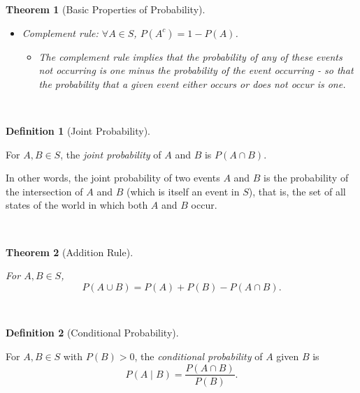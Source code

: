 \documentclass[
]{article}
\providecommand{\tightlist}{%
  \setlength{\itemsep}{0pt}\setlength{\parskip}{0pt}}
\newtheorem{theorem}{Theorem}[section]
\theoremstyle{definition}
\newtheorem{definition}{Definition}[section]
\theoremstyle{definition}
\theoremstyle{definition}
\theoremstyle{remark}
\begin{document}
\begin{theorem}[Basic Properties of Probability]
\begin{itemize}
  \begin{itemize}
  \tightlist
  \item
    Monotonicity and unitarity (and non-negativity) imply the probability bounds since \(A \subseteq \Omega\).
  \end{itemize}
\item
  \emph{Complement rule}: \(\forall A \in S\), \(P(A^c) = 1 - P(A)\).

  \begin{itemize}
  \tightlist
  \item
    The complement rule implies that the probability of any of these events not occurring is one minus the probability of the event occurring - so that the probability that a given event either occurs or does not occur is one.
  \end{itemize}
\end{itemize}

~

\end{theorem}

\begin{definition}[Joint Probability]
\protect\hypertarget{def:unlabeled-div-5}{}\label{def:unlabeled-div-5}

For \(A, B \in S\), the \emph{joint probability} of \(A\) and \(B\) is \(P(A \cap B)\).

In other words, the joint probability of two events \(A\) and \(B\) is the probability of the intersection of \(A\) and \(B\) (which is itself an event in \(S\)), that is, the set of all states of the world in which both \(A\) and \(B\) occur.

~

\end{definition}

\begin{theorem}[Addition Rule]
\protect\hypertarget{thm:unlabeled-div-6}{}\label{thm:unlabeled-div-6}

For \(A, B \in S\),
\[P(A \cup B) = P(A) + P(B) - P(A \cap B).\]

~

\end{theorem}

\begin{definition}[Conditional Probability]
\protect\hypertarget{def:unlabeled-div-7}{}\label{def:unlabeled-div-7}

For \(A, B \in S\) with \(P(B) > 0\), the \emph{conditional probability} of \(A\) given \(B\) is
\[P(A \mid B) = \frac {P(A \cap B)}{P(B)}.\]

~

\end{definition}
\end{document}
